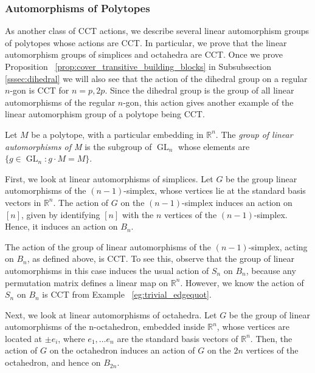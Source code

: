 \documentclass[smallextended]{svjour3}       %
\numberwithin{equation}{section}
\newcommand\sssec{\subsubsection}
\begin{document}
\sssec{Automorphisms of Polytopes}
\label{sssec:polytopes}

As another class of CCT actions, we describe several linear automorphism groups of polytopes whose actions are CCT. In particular, we prove that the linear automorphism groups of simplices and octahedra are CCT.
Once we prove Proposition ~\ref{prop:cover_transitive_building_blocks} in Subsubsection \ref{sssec:dihedral} we will also see that the action of the dihedral group on a regular $n$-gon is CCT for $n = p,2p$.  Since the dihedral group is the group of all linear automorphisms of the regular $n$-gon, this action gives another example of the linear automorphism group of a polytope being CCT.

\begin{definition}
Let $M$ be a polytope, with a particular embedding in $\mathbb R^n$. The {\it group of linear automorphisms of M} is the subgroup of $\operatorname{GL}_n$ whose elements are $\{g \in \operatorname{GL}_n\colon g \cdot M = M\}$.
\end{definition}

First, we look at linear automorphisms of simplices. Let $G$ be the group linear automorphisms of the $(n-1)$-simplex, whose vertices lie at the standard basis vectors in $\mathbb R^n$. The action of $G$ on the $(n-1)$-simplex induces an action on $[n]$, given by identifying $[n]$ with the $n$ vertices of the $(n-1)$-simplex. Hence, it induces an action on $B_n$.

\begin{example}
The action of the group of linear automorphisms of the $(n-1)$-simplex, acting on $B_n$, as defined above, is CCT. To see this, observe that the group of linear automorphisms in this case induces the usual action of $S_n$ on $B_n$, because any permutation matrix defines a linear map on $\mathbb R^n$. However, we know the action of $S_n$ on $B_n$ is CCT from Example ~\ref{eg:trivial_edgequot}.
\end{example}

Next, we look at linear automorphisms of octahedra. Let $G$ be the group of linear automorphisms of the n-octahedron, embedded inside $\mathbb R^n$, whose vertices are located at $\pm e_i$, where $e_1,\ldots e_n$ are the standard basis vectors of $\mathbb R^n$. Then, the action of $G$ on the octahedron induces an action of $G$ on the $2n$ vertices of the octahedron, and hence on $B_{2n}$.
\end{document}
